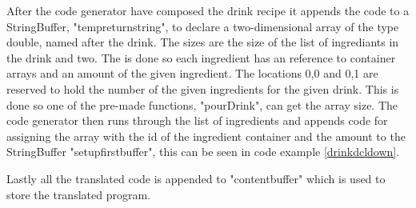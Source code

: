 After the code generator have composed the drink recipe it appends the code to a StringBuffer, "tempreturnstring", to declare a two-dimensional array of the type double, named after the drink. The sizes are the size of the list of ingrediants in the drink and two. The is done so each ingredient has an reference to container arrays and an amount of the given ingredient. The locations 0,0 and 0,1 are reserved to hold the number of the given ingredients for the given drink. This is done so one of the pre-made functions, "pourDrink", can get the array size. The code generator then runs through the list of ingredients and appends code for assigning the array with the id of the ingredient container and the amount to the StringBuffer "setupfirstbuffer", this can be seen in code example \ref{drinkdcldown}.

Lastly all the translated code is appended to "contentbuffer" which is used to store the translated program.